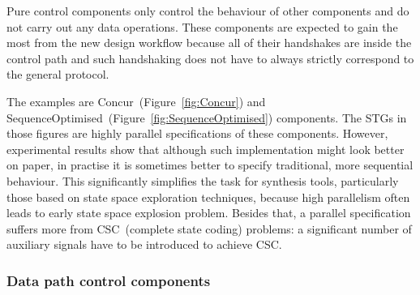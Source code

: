 Pure control components only control the behaviour of other components
and do not carry out any data operations. These components are expected
to gain the most from the new design workflow because all of their
handshakes are inside the control path and such handshaking does not
have to always strictly correspond to the general protocol.

The examples are Concur~(Figure~\ref{fig:Concur}) and SequenceOptimised~(Figure~\ref{fig:SequenceOptimised})
components. The STGs in those figures are highly parallel specifications
of these components. However, experimental results show that although
such implementation might look better on paper, in practise it is
sometimes better to specify traditional, more sequential behaviour.
This significantly simplifies the task for synthesis tools, particularly
those based on state space exploration techniques, because high parallelism
often leads to early state space explosion problem. Besides that,
a parallel specification suffers more from CSC~(complete state coding)
problems: a significant number of auxiliary signals have to be introduced
to achieve CSC.


\subsubsection{Data path control components}

